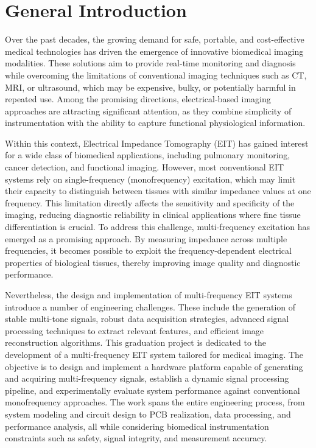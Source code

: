 
\chapter*{General Introduction}

Over the past decades, the growing demand for safe, portable, and cost-effective medical technologies has driven the emergence of innovative biomedical imaging modalities. These solutions aim to provide real-time monitoring and diagnosis while overcoming the limitations of conventional imaging techniques such as CT, MRI, or ultrasound, which may be expensive, bulky, or potentially harmful in repeated use. Among the promising directions, electrical-based imaging approaches are attracting significant attention, as they combine simplicity of instrumentation with the ability to capture functional physiological information.

Within this context, Electrical Impedance Tomography (EIT) has gained interest for a wide class of biomedical applications, including pulmonary monitoring, cancer detection, and functional imaging. However, most conventional EIT systems rely on single-frequency (monofrequency) excitation, which may limit their capacity to distinguish between tissues with similar impedance values at one frequency. This limitation directly affects the sensitivity and specificity of the imaging, reducing diagnostic reliability in clinical applications where fine tissue differentiation is crucial. To address this challenge, multi-frequency excitation has emerged as a promising approach. By measuring impedance across multiple frequencies, it becomes possible to exploit the frequency-dependent electrical properties of biological tissues, thereby improving image quality and diagnostic performance.

Nevertheless, the design and implementation of multi-frequency EIT systems introduce a number of engineering challenges. These include the generation of stable multi-tone signals, robust data acquisition strategies, advanced signal processing techniques to extract relevant features, and efficient image reconstruction algorithms. This graduation project is dedicated to the development of a multi-frequency EIT system tailored for medical imaging. The objective is to design and implement a hardware platform capable of generating and acquiring multi-frequency signals, establish a dynamic signal processing pipeline, and experimentally evaluate system performance against conventional monofrequency approaches. The work spans the entire engineering process, from system modeling and circuit design to PCB realization, data processing, and performance analysis, all while considering biomedical instrumentation constraints such as safety, signal integrity, and measurement accuracy.

